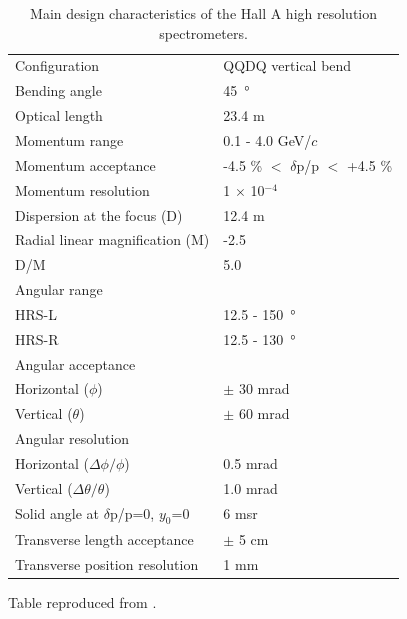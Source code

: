 \begin{table}[tb!]
\begin{tabular}{ll}
\hline
Configuration                         & QQDQ vertical bend                  \\
Bending angle                         & \SI{45}{\degree}                    \\
Optical length                        & 23.4 m                              \\
Momentum range                        & 0.1 - 4.0 GeV/$c$                   \\
Momentum acceptance                   & -4.5 \% $<$ $\delta$p/p $<$ +4.5 \% \\
Momentum resolution                   & 1 $\times$ 10$^{-4}$                \\
Dispersion at the focus (D)           & 12.4 m                              \\
Radial linear magnification (M)       & -2.5                                \\
D/M                                   & 5.0                                 \\
Angular range                         &                                     \\
HRS-L                                 & 12.5 - \SI{150}{\degree}            \\
HRS-R                                 & 12.5 - \SI{130}{\degree}            \\
Angular acceptance                    &                                     \\
Horizontal ($\phi$)                   & $\pm$ 30 mrad                       \\
Vertical ($\theta$)                   & $\pm$ 60 mrad                       \\
Angular resolution                    &                                     \\
Horizontal ($\Delta\phi/\phi$)        & 0.5 mrad                            \\
Vertical ($\Delta\theta/\theta$)      & 1.0 mrad                            \\
Solid angle at $\delta$p/p=0, $y_0$=0 & 6 msr                               \\
Transverse length acceptance          & $\pm$ 5 cm                          \\
Transverse position resolution        & 1 mm                                \\ \hline
\end{tabular}
\caption[Main design characteristics of the Hall A high resolution spectrometers]
{Main design characteristics of the Hall A high resolution spectrometers.}\label{tab:HRS_chars}
Table reproduced from \cite{Alcorn2004}.
\end{table}


